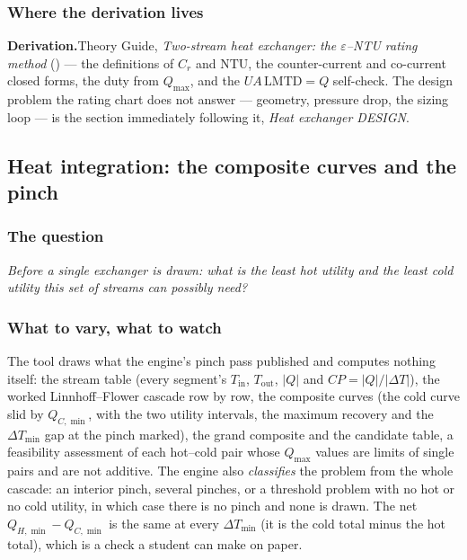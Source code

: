 \documentclass[11pt,a4paper]{article}
\newcommand{\derivation}[1]{%
  \smallskip\noindent\textbf{\sffamily\small Derivation.}\quad #1\par\smallskip}
\begin{document}
\subsubsection*{Where the derivation lives}

\derivation{Theory Guide, \emph{Two-stream heat exchanger: the
$\varepsilon$--NTU rating method} (\theorydest{ch:hx-entu}) --- the
definitions of $C_r$ and $\mathrm{NTU}$, the counter-current and
co-current closed forms, the duty from $Q_{\max}$, and the
$UA\,\mathrm{LMTD} = Q$ self-check.  The design problem the rating chart
does not answer --- geometry, pressure drop, the sizing loop --- is the
section immediately following it, \emph{Heat exchanger DESIGN}.}

\subsection{Heat integration: the composite curves and the pinch}\label{sec:edu-pinch}


\subsubsection*{The question}

\emph{Before a single exchanger is drawn: what is the least hot utility
and the least cold utility this set of streams can possibly need?}

\subsubsection*{What to vary, what to watch}

The tool draws what the engine's pinch pass published and computes
nothing itself: the stream table (every segment's $T_{\mathrm{in}}$,
$T_{\mathrm{out}}$, $|Q|$ and $CP = |Q|/|\Delta T|$), the worked
Linnhoff--Flower cascade row by row, the composite curves (the cold curve
slid by $Q_{C,\min}$, with the two utility intervals, the maximum recovery
and the $\Delta T_{\min}$ gap at the pinch marked), the grand composite and
the candidate table, a feasibility assessment of each hot--cold pair whose
$Q_{\max}$ values are limits of single pairs and are not additive.  The
engine also \emph{classifies} the problem from the whole cascade: an
interior pinch, several pinches, or a threshold problem with no hot or no
cold utility, in which case there is no pinch and none is drawn.  The
net $Q_{H,\min}-Q_{C,\min}$ is the same at every $\Delta T_{\min}$ (it is
the cold total minus the hot total), which is a check a student can make
on paper.
\end{document}
